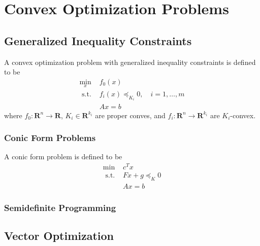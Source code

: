 \chapter{Convex Optimization Problems}

\section{Generalized Inequality Constraints}

\begin{definition}
    A convex optimization problem with generalized inequality constraints is defined to be
    \begin{equation}
        \begin{array}{ll}
            \min_x        & f_{0}(x)                                    \\
            \text{ s.t. } & f_{i}(x)\preceq_{K_{i}}0,\quad i=1,\ldots,m \\
                          & Ax=b
        \end{array}
    \end{equation}
    where $f_{0}:\mathbf{R}^n\rightarrow\mathbf{R}$, $K_i\in\mathbf{R}^{k_i}$ are proper conves, and $f_i:\mathbf{R}^n\rightarrow\mathbf{R}^{k_i}$ are $K_i$-convex.
\end{definition}

\subsection{Conic Form Problems}

\begin{definition}
    A conic form problem is defined to be
    \begin{equation}
        \begin{array}{ll}
            \min          & c^{T}x           \\
            \text{ s.t. } & Fx+g\preceq_{K}0 \\
                          & Ax=b
        \end{array}
    \end{equation}
\end{definition}

\subsection{Semidefinite Programming}

\section{Vector Optimization}